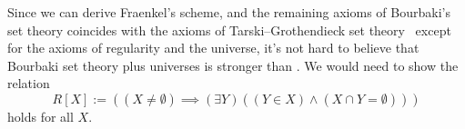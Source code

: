 \begin{node}
\begin{node}\label{bourbaki-000I}%
Since we can derive Fraenkel's scheme, and the remaining axioms of
Bourbaki's set theory coincides with the axioms of Tarski--Grothendieck
set theory~ except for the axioms of
regularity and the universe, it's not hard to believe that Bourbaki set
theory plus universes is stronger than \ZFC. We would need to show the relation
\[R[X]:=((X\neq\emptyset)\implies(\exists Y)((Y\in X)\land(X\cap Y=\emptyset)))\]
holds for all $X$.
\end{node}
\end{node}
